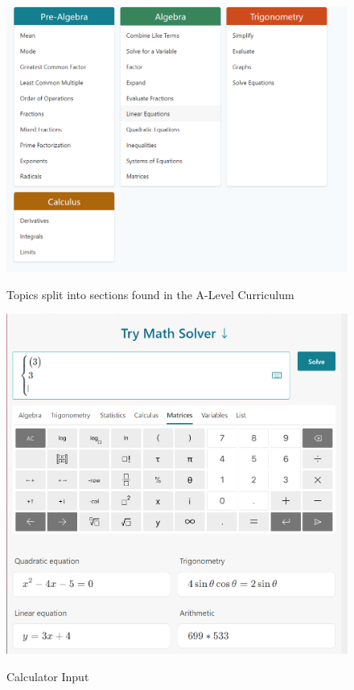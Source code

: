 \documentclass[final]{cmpreport}
\begin{document}
	\begin{figure}[h!]
		\caption{Topics split into sections found in the A-Level Curriculum}
		\centering
		\includegraphics[scale=0.3]{mathsolver2.png}
		\label{fig:topic}
		\end{figure}
	\begin{figure}[h!]
		\caption{Calculator Input}
		\centering
		\includegraphics[scale=0.3]{mathsolver.png}
		\label{fig:calc}
	\end{figure}
	
\end{document}
